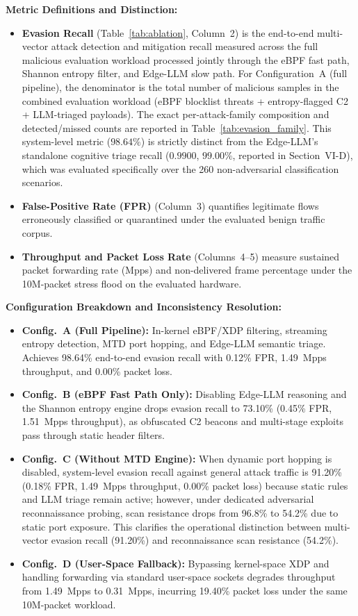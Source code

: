 \documentclass[journal]{IEEEtran}
\renewcommand{\_}{\textunderscore\allowbreak}
\begin{document}
\textbf{Metric Definitions and Distinction:}
\begin{itemize}
  \item \textbf{Evasion Recall} (Table~\ref{tab:ablation}, Column~2) is the end-to-end
    multi-vector attack detection and mitigation recall measured across the full malicious
    evaluation workload processed jointly through the eBPF fast path, Shannon entropy
    filter, and Edge-LLM slow path. For Configuration~A (full pipeline), the
    denominator is the total number of malicious samples in the combined evaluation
    workload (eBPF blocklist threats + entropy-flagged C2 + LLM-triaged payloads).
    The exact per-attack-family composition and detected/missed counts are reported in
    Table~\ref{tab:evasion_family}. This system-level metric ($\mathbf{98.64\%}$)
    is strictly distinct from the Edge-LLM's standalone cognitive triage recall
    ($0.9900$, $99.00\%$, reported in Section~VI-D), which was evaluated specifically
    over the 260 non-adversarial classification scenarios.
  \item \textbf{False-Positive Rate (FPR)} (Column~3) quantifies legitimate flows
    erroneously classified or quarantined under the evaluated benign traffic corpus.
  \item \textbf{Throughput and Packet Loss Rate} (Columns~4--5) measure sustained
    packet forwarding rate (Mpps) and non-delivered frame percentage under the
    10M-packet stress flood on the evaluated hardware.
\end{itemize}

\textbf{Configuration Breakdown and Inconsistency Resolution:}
\begin{itemize}
  \item \textbf{Config.~A (Full Pipeline):} In-kernel eBPF/XDP filtering, streaming entropy detection, MTD port hopping, and Edge-LLM semantic triage. Achieves 98.64\% end-to-end evasion recall with 0.12\% FPR, 1.49~Mpps throughput, and 0.00\% packet loss.
  \item \textbf{Config.~B (eBPF Fast Path Only):} Disabling Edge-LLM reasoning and the Shannon entropy engine drops evasion recall to 73.10\% (0.45\% FPR, 1.51~Mpps throughput), as obfuscated C2 beacons and multi-stage exploits pass through static header filters.
  \item \textbf{Config.~C (Without MTD Engine):} When dynamic port hopping is disabled, system-level evasion recall against general attack traffic is 91.20\% (0.18\% FPR, 1.49~Mpps throughput, 0.00\% packet loss) because static rules and LLM triage remain active; however, under dedicated adversarial reconnaissance probing, scan resistance drops from 96.8\% to 54.2\% due to static port exposure. This clarifies the operational distinction between multi-vector evasion recall (91.20\%) and reconnaissance scan resistance (54.2\%).
  \item \textbf{Config.~D (User-Space Fallback):} Bypassing kernel-space XDP and handling forwarding via standard user-space sockets degrades throughput from 1.49~Mpps to 0.31~Mpps, incurring 19.40\% packet loss under the same 10M-packet workload.
\end{itemize}
\end{document}
